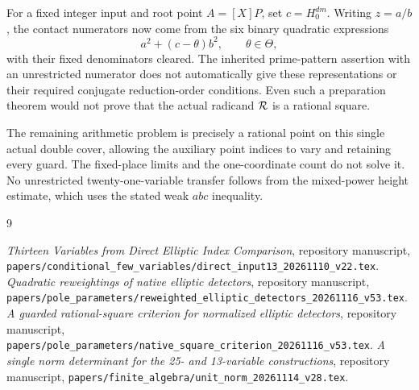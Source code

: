 \documentclass[11pt,a4paper]{article}
\begin{document}
For a fixed integer input and root point \(A=[X]P\), set
\(c=H_0^{dm}\). Writing \(z=a/b\), the contact numerators now come
from the six binary quadratic expressions
\[
 a^2+(c-\theta)b^2,\qquad \theta\in\Theta,
\]
with their fixed denominators cleared.
The inherited prime-pattern assertion with an unrestricted numerator
does not automatically give these representations or their required
conjugate reduction-order conditions. Even such a preparation theorem
would not prove that the actual radicand \({\cal R}\) is a rational square.

The remaining arithmetic problem is precisely a rational point on
this single actual double cover, allowing the auxiliary point indices
to vary and retaining every guard. The fixed-place limits and the
one-coordinate count do not solve it. No unrestricted twenty-one-variable
transfer follows from the mixed-power height estimate, which uses
the stated weak \(abc\) inequality.

\begin{thebibliography}{9}\raggedright
{}
\emph{Thirteen Variables from Direct Elliptic Index Comparison},
repository manuscript,
\nolinkurl{papers/conditional_few_variables/direct_input13_20261110_v22.tex}.
\emph{Quadratic reweightings of native elliptic detectors},
repository manuscript,
\nolinkurl{papers/pole_parameters/reweighted_elliptic_detectors_20261116_v53.tex}.
\emph{A guarded rational-square criterion for normalized elliptic detectors},
repository manuscript,
\nolinkurl{papers/pole_parameters/native_square_criterion_20261116_v53.tex}.
\emph{A single norm determinant for the 25- and 13-variable constructions},
repository manuscript,
\nolinkurl{papers/finite_algebra/unit_norm_20261114_v28.tex}.
\end{thebibliography}
\end{document}

